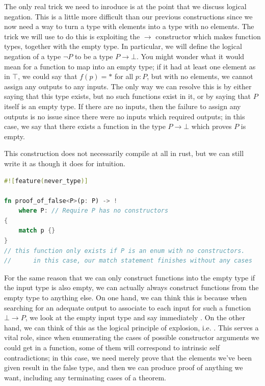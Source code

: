 \documentclass[11pt]{article}
\begin{document}
The only real trick we need to inroduce is at the point that we discuss logical negation. This is a little more difficult than our previous constructions since we now need a way to turn a type with elements into a type with no elements. The trick we will use to do this is exploiting the $\to$ constructor which makes function types, together with the empty type. In particular, we will define the logical negation of a type $\neg P$ to be a type $P \to \bot$. You might wonder what it would mean for a function to map into an empty type; if it had at least one element as in $\top$, we could say that $f(p) = *$ for all $p \colon P$, but with no elements, we cannot assign any outputs to any inputs. The only way we can resolve this is by either saying that this type exists, but no such functions exist in it, or by saying that $P$ itself is an empty type. If there are no inputs, then the failure to assign any outputs is no issue since there were no inputs which required outputs; in this case, we say that there exists a function in the type $P \to \bot$ which proves $P$ is empty.

This construction does not necessarily compile at all in rust, but we can still write it as though it does for intuition. \begin{lstlisting}[language=Rust]
#![feature(never_type)]

fn proof_of_false<P>(p: P) -> !
	where P: // Require P has no constructors
{
	match p {}
}
// this function only exists if P is an enum with no constructors.
//		in this case, our match statement finishes without any cases
\end{lstlisting}

For the same reason that we can only construct functions into the empty type if the input type is also empty, we can actually always construct functions from the empty type to anything else. On one hand, we can think this is because when searching for an adequate output to associate to each input for such a function $\bot \to P$, we look at the empty input type and say immediately . On the other hand, we can think of this as the logical principle of explosion, i.e. . This serves a vital role, since when enumerating the cases of possible constructor arguments we could get in a function, some of them will correspond to intrinsic self contradictions; in this case, we need merely prove that the elements we've been given result in the false type, and then we can produce proof of anything we want, including any terminating cases of a theorem.
\end{document}
